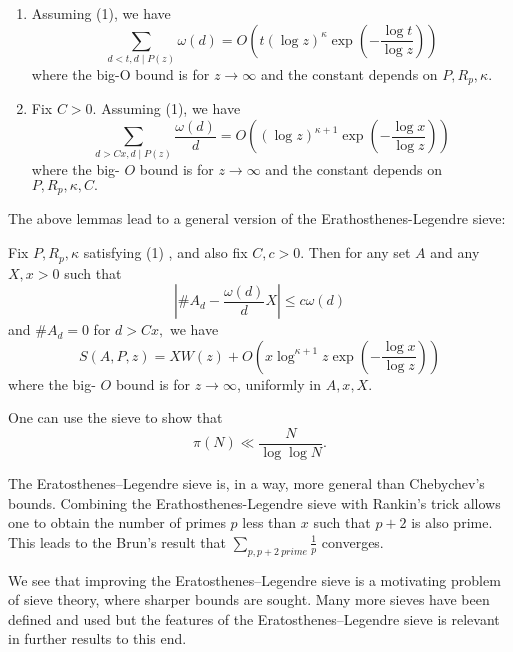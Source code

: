 \begin{lemma}
\begin{enumerate}
    \item Assuming (1), we have
$$
\sum_{d<t, d \mid P(z)} \omega(d)=O\left(t(\log z)^{\kappa} \exp \left(-\frac{\log t}{\log z}\right)\right)
$$
where the big-O bound is for $z \rightarrow \infty$ and the constant depends on $P, R_{p}, \kappa$.
    \item Fix $C>0 .$ Assuming (1), we have
$$
\sum_{d>C x, d \mid P(z)} \frac{\omega(d)}{d}=O\left((\log z)^{\kappa+1} \exp \left(-\frac{\log x}{\log z}\right)\right)
$$
where the big- $O$ bound is for $z \rightarrow \infty$ and the constant depends on $P, R_{p}, \kappa, C .$
\end{enumerate}
 
\end{lemma}

The above lemmas lead to a general version of the  Erathosthenes-Legendre sieve:

\begin{theorem}[]
Fix $P, R_{p}, \kappa$ satisfying (1) , and also fix $C, c>0$. Then for any set $A$ and any $X, x>0$ such that
$$
\left|\# A_{d}-\frac{\omega(d)}{d} X\right| \leq c \omega(d)
$$
and $\# A_{d}=0$ for $d>C x,$ we have
$$
S(A, P, z)=X W(z)+O\left(x \log ^{\kappa+1} z \exp \left(-\frac{\log x}{\log z}\right)\right)
$$
where the big- $O$ bound is for $z \rightarrow \infty$, uniformly in $A, x, X$.
\end{theorem}

One can use the sieve to show that 
$$
\pi(N) \ll \frac{N}{\log \log N}.
$$

The Eratosthenes–Legendre sieve is, in a way, more general than Chebychev’s bounds. Combining the Erathosthenes-Legendre sieve with Rankin's trick allows one to obtain the number of primes $p$ less than $x$ such that $p+2$ is also prime. This leads to the Brun's result that $\sum_{p,p+2\ prime}\frac{1}{p}$ converges.\cite{cojocarumurty}\cite{kedlaya}

We see that improving the Eratosthenes–Legendre sieve is a motivating problem of sieve theory, where sharper bounds are sought. Many more sieves have been defined and used but the features of the Eratosthenes–Legendre sieve is relevant in further results to this end.

